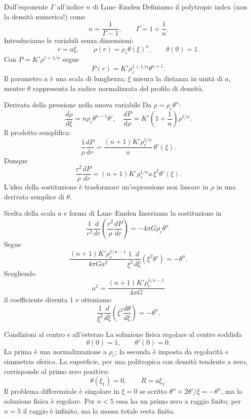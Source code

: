 \begin{frame}[t]{Dall'esponente $\Gamma$ all'indice $n$ di Lane--Emden}
\small
Definiamo il polytropic index (non la densità numerica!) come
\[
n=\frac1{\Gamma-1},\qquad\Gamma=1+\frac1n.
\]
Introduciamo le variabili senza dimensioni:
\[
r=a\xi,\qquad \rho(r)=\rho_c\theta(\xi)^n,\qquad \theta(0)=1.
\]
Con $P=K'\rho^{1+1/n}$ segue
\[
P(r)=K'\rho_c^{1+1/n}\theta^{n+1}.
\]
Il parametro $a$ è una scala di lunghezza; $\xi$ misura la distanza in unità di $a$, mentre $\theta$ rappresenta la radice normalizzata del profilo di densità.
\end{frame}

\begin{frame}[t]{Derivata della pressione nella nuova variabile}
\small
Da $\rho=\rho_c\theta^n$:
\[
\frac{d\rho}{d\xi}=n\rho_c\theta^{n-1}\theta',
\quad \frac{dP}{d\rho}=K'\left(1+\frac1n\right)\rho^{1/n}.
\]
Il prodotto semplifica:
\[
\frac1\rho\frac{dP}{dr}
=\frac{(n+1)K'\rho_c^{1/n}}{a}\,\theta'(\xi).
\]
Dunque
\[
\frac{r^2}{\rho}\frac{dP}{dr}
=(n+1)K'\rho_c^{1/n}a\,\xi^2\theta'(\xi).
\]
L'idea della sostituzione è trasformare un'espressione non lineare in $\rho$ in una derivata semplice di $\theta$.
\end{frame}

\begin{frame}[t]{Scelta della scala $a$ e forma di Lane--Emden}
\small
Inseriamo la sostituzione in
\[
\frac1{r^2}\frac{d}{dr}\left(\frac{r^2}{\rho}\frac{dP}{dr}\right)=-4\pi G\rho_c\theta^n.
\]
Segue
\[
\frac{(n+1)K'\rho_c^{1/n-1}}{4\pi G a^2}
\frac1{\xi^2}\frac d{d\xi}(\xi^2\theta')=-\theta^n.
\]
Scegliendo
\[
a^2=\frac{(n+1)K'\rho_c^{1/n-1}}{4\pi G}
\]
il coefficiente diventa 1 e otteniamo
\[
\frac1{\xi^2}\frac d{d\xi}
\left(\xi^2\frac{d\theta}{d\xi}\right)=-\theta^n.
\]
\end{frame}

\begin{frame}[t]{Condizioni al centro e all'esterno}
\small
La soluzione fisica regolare al centro soddisfa
\[
\theta(0)=1,\qquad \theta'(0)=0.
\]
La prima è una normalizzazione a $\rho_c$; la seconda è imposta da regolarità e simmetria sferica.
\medskip
La superficie, per una politropica con densità tendente a zero, corrisponde al primo zero positivo:
\[
\theta(\xi_1)=0,\qquad R=a\xi_1.
\]
Il problema differenziale è singolare in $\xi=0$ se scritto $\theta''+2\theta'/\xi=-\theta^n$, ma la soluzione fisica è regolare.
\medskip
Per $n<5$ essa ha un primo zero a raggio finito; per $n=5$ il raggio è infinito, ma la massa totale resta finita.
\end{frame}

